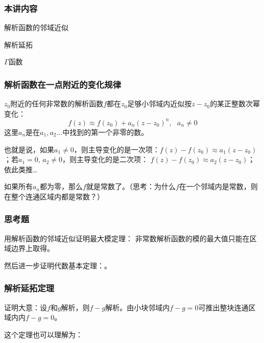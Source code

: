 \documentclass[CJK, 13pt]{beamer}
\date{}
\begin{document}
  \bch
{}

\begin{frame}
\frametitle{本讲内容}

\bitem
\item{解析函数的邻域近似}
\item{解析延拓}  
\item{$\Gamma$函数}
\eitem

\end{frame}


\begin{frame}
  \frametitle{解析函数在一点附近的变化规律}
  
  
  {\blue $z_0$附近的任何非常数的解析函数$f$都在$z_0$足够小邻域内近似按$z-z_0$的某正整数次幂变化：
  $$f(z)\approx f(z_0) + a_n(z-z_0)^n ,\ \ \  a_n\ne 0$$
  这里$a_n$是在$a_1,a_2\ldots$中找到的第一个非零的数。}


  \skiplines
  
  也就是说，如果$a_1\ne 0$，则主导变化的是一次项：$f(z)- f(z_0) \approx a_1(z-z_0)$；若$a_1 = 0$, $a_2\ne 0$，则主导变化的是二次项：  $f(z)-f(z_0) \approx a_2(z-z_0)$；依此类推…

  \skiplines

  如果所有$a_n$都为零，那么$f$就是常数了。（思考：为什么$f$在一个邻域内是常数，则在整个连通区域内都是常数？）
  
\end{frame}


\begin{frame}
  \frametitle{思考题}

  用解析函数的邻域近似证明最大模定理： {\blue 非常数解析函数的模的最大值只能在区域边界上取得。}

  \skipline
  然后进一步证明代数基本定理：{。}
\end{frame}




\begin{frame}
  \frametitle{解析延拓定理}
  
  

  证明大意：设$f$和$g$解析，则$f-g$解析。由小块邻域内$f-g=0$可推出整块连通区域内内$f-g=0$。

  \skiplines

  这个定理也可以理解为：
  
  
\end{frame}
\end{document}

